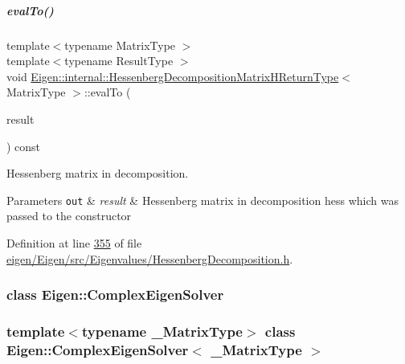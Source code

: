 \mbox{\label{group___eigenvalues___module_a7f1d84113072d2d2e507d3821ff9f15c}} 
\subparagraph{\texorpdfstring{eval\+To()}{evalTo()}\hspace{0.1cm}{\footnotesize\ttfamily [2/2]}}
{\footnotesize\ttfamily template$<$typename Matrix\+Type $>$ \\
template$<$typename Result\+Type $>$ \\
void \hyperlink{group___eigenvalues___module_struct_eigen_1_1internal_1_1_hessenberg_decomposition_matrix_h_return_type}{Eigen\+::internal\+::\+Hessenberg\+Decomposition\+Matrix\+H\+Return\+Type}$<$ Matrix\+Type $>$\+::eval\+To (\begin{DoxyParamCaption}\item[{Result\+Type \&}]{result }\end{DoxyParamCaption}) const\hspace{0.3cm}{\ttfamily [inline]}}



Hessenberg matrix in decomposition. 


\begin{DoxyParams}[1]{Parameters}
\mbox{\tt out}  & {\em result} & Hessenberg matrix in decomposition {\ttfamily hess} which was passed to the constructor \\
\hline
\end{DoxyParams}


Definition at line \hyperlink{eigen_2_eigen_2src_2_eigenvalues_2_hessenberg_decomposition_8h_source_l00355}{355} of file \hyperlink{eigen_2_eigen_2src_2_eigenvalues_2_hessenberg_decomposition_8h_source}{eigen/\+Eigen/src/\+Eigenvalues/\+Hessenberg\+Decomposition.\+h}.

\label{class_eigen_1_1_complex_eigen_solver}
\subsubsection{class Eigen\+:\+:Complex\+Eigen\+Solver}
\subsubsection*{template$<$typename \+\_\+\+Matrix\+Type$>$\newline
class Eigen\+::\+Complex\+Eigen\+Solver$<$ \+\_\+\+Matrix\+Type $>$}

